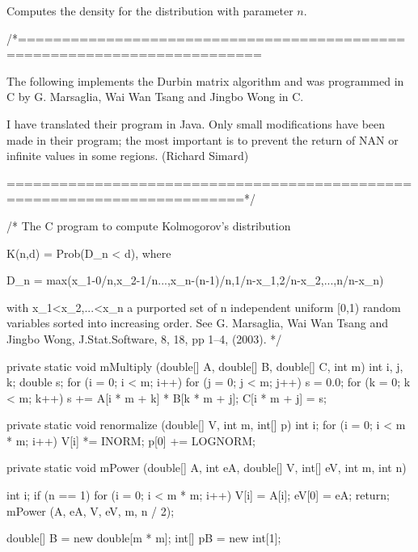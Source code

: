 \begin{tabb} Computes the density for the \ks{} distribution with
  parameter $n$.
\end{tabb}
\begin{code}\begin{hide}

   /*=========================================================================

   The following implements the Durbin matrix algorithm and was programmed
   in C by G. Marsaglia, Wai Wan Tsang and Jingbo Wong in C.

   I have translated their program in Java. Only small modifications have
   been made in their program; the most important is to prevent the return
   of NAN or infinite values in some regions. (Richard Simard)

   =========================================================================*/

   /*
    The C program to compute Kolmogorov's distribution

                K(n,d) = Prob(D_n < d),         where

         D_n = max(x_1-0/n,x_2-1/n...,x_n-(n-1)/n,1/n-x_1,2/n-x_2,...,n/n-x_n)

       with  x_1<x_2,...<x_n  a purported set of n independent uniform [0,1)
       random variables sorted into increasing order.
       See G. Marsaglia, Wai Wan Tsang and Jingbo Wong,
          J.Stat.Software, 8, 18, pp 1--4, (2003).
   */


   private static void mMultiply (double[] A, double[] B, double[] C, int m){
      int i, j, k;
      double s;
      for (i = 0; i < m; i++)
         for (j = 0; j < m; j++) {
            s = 0.0;
            for (k = 0; k < m; k++)
               s += A[i * m + k] * B[k * m + j];
            C[i * m + j] = s;
         }
   }


   private static void renormalize (double[] V, int m, int[] p)
   {
      int i;
      for (i = 0; i < m * m; i++)
         V[i] *= INORM;
      p[0] += LOGNORM;
   }


   private static void mPower (double[] A, int eA, double[] V, int[] eV,
                                              int m, int n)
   {
      int i;
      if (n == 1) {
         for (i = 0; i < m * m; i++)
            V[i] = A[i];
         eV[0] = eA;
         return;
      }
      mPower (A, eA, V, eV, m, n / 2);

      double[] B = new double[m * m];
      int[] pB = new int[1];

}
\end{hide}
\end{code}
